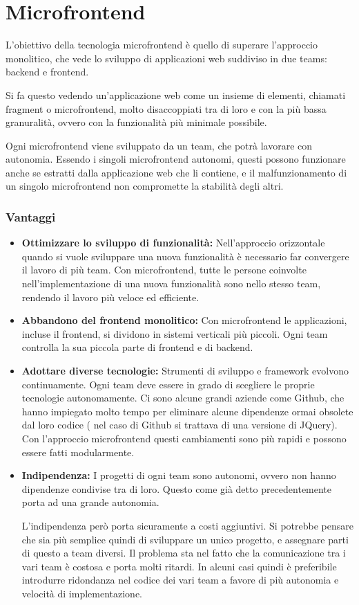 \chapter{Microfrontend}\label{ch:chapter1}
L'obiettivo della tecnologia microfrontend è quello di superare l'approccio monolitico, che vede
lo sviluppo di applicazioni web suddiviso in due teams: backend e frontend.

Si fa questo vedendo un'applicazione web come un insieme
di elementi, chiamati fragment o microfrontend, molto disaccoppiati tra di loro
e con la più bassa granuralità, ovvero con la funzionalità più minimale possibile.

Ogni microfrontend viene sviluppato da un team, che potrà lavorare con autonomia. 
Essendo i singoli microfrontend autonomi,
questi possono funzionare anche se estratti dalla applicazione web che li contiene,
 e il malfunzionamento di un singolo microfrontend
non compromette la stabilità degli altri.



\subsection{Vantaggi}
\begin{itemize}
    \item \textbf{Ottimizzare lo sviluppo di funzionalità:}
Nell’approccio orizzontale quando si vuole sviluppare una nuova funzionalità è necessario far convergere il 
lavoro di più team. Con microfrontend,
  tutte le persone coinvolte nell’implementazione di una nuova funzionalità sono nello 
  stesso team, rendendo il lavoro più veloce ed efficiente. 
    \item \textbf{Abbandono del frontend monolitico:}
Con microfrontend le applicazioni, incluse il frontend, si dividono in sistemi verticali
 più piccoli. Ogni team controlla la sua piccola parte di frontend e di backend.
    \item \textbf{Adottare diverse tecnologie:}
Strumenti di sviluppo e framework evolvono continuamente. Ogni team deve essere in grado di scegliere
le proprie tecnologie autonomamente. Ci sono alcune grandi aziende
 come Github, che hanno
 impiegato molto tempo per eliminare alcune dipendenze ormai obsolete dal loro codice ( nel caso di Github si trattava di una versione di JQuery).
  Con l’approccio microfrontend questi cambiamenti sono più rapidi e possono essere
   fatti modularmente.


\item \textbf{Indipendenza:}
I progetti di ogni team sono autonomi, ovvero non hanno dipendenze condivise tra di loro.
Questo come già detto precedentemente porta ad una grande autonomia.

L’indipendenza però porta sicuramente a costi aggiuntivi. Si potrebbe pensare che sia
 più semplice quindi di sviluppare un unico progetto, e assegnare parti di questo a team diversi. 
 Il problema sta nel fatto che la comunicazione tra i vari team è costosa e porta molti ritardi.
In alcuni casi quindi è preferibile introdurre ridondanza nel codice dei vari team a favore di più autonomia e velocità di
 implementazione.

\end{itemize}

